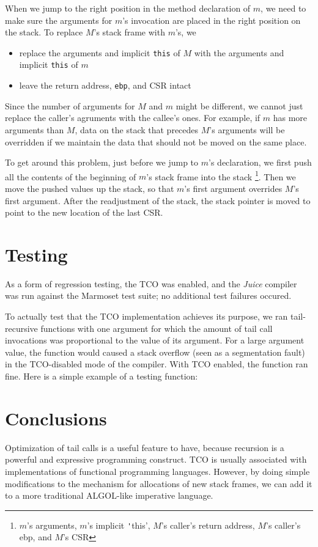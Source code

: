\documentclass{tufte-handout}
\begin{document}
When we jump to the right position in the method declaration of $m$, we need to make sure the arguments for $m$'s invocation are placed in the right position on the stack. To replace $M$'s stack frame with $m$'s, we

\begin{itemize}
  \item replace the arguments and implicit \verb'this' of $M$ with the arguments and implicit \verb'this' of $m$
  \item leave the return address, \verb'ebp', and CSR intact
\end{itemize}

Since the number of arguments for $M$ and $m$ might be different, we cannot just replace the caller's agruments with the callee's ones. For example, if $m$  has more arguments than $M$, data on the stack that precedes $M$'s arguments will be overridden if we maintain the data that should not be moved on the same place. 

To get around this problem, just before we jump to $m$'s declaration, we first push all the contents of the beginning of $m$'s stack frame into the stack \footnote{$m$'s arguments, $m$'s implicit \texttt'this', $M$'s caller's return address, $M$'s caller's ebp, and $M$'s CSR}. Then we move the pushed values up the stack, so that $m$'s first argument overrides $M$'s first argument. After the readjustment of the stack, the stack pointer is moved to point to the new location of the last CSR.

\section{Testing}
As a form of regression testing, the TCO was enabled, and the \textit{Juice} compiler was run against the Marmoset test suite; no additional test failures occured. 

To actually test that the TCO implementation achieves its purpose, we ran tail-recursive functions with one argument for which the amount of tail call invocations was proportional to the value of its argument. For a large argument value, the function would caused a stack overflow (seen as a segmentation fault) in the TCO-disabled mode of the compiler. With TCO enabled, the function ran fine. Here is a simple example of a testing function:


\section{Conclusions}
Optimization of tail calls is a useful feature to have, because recursion is a powerful and expressive programming construct.
TCO is usually associated with implementations of functional programming languages. However, by doing simple modifications to the mechanism for allocations of new stack frames, we can add it to a more traditional ALGOL-like imperative language.
\end{document}
